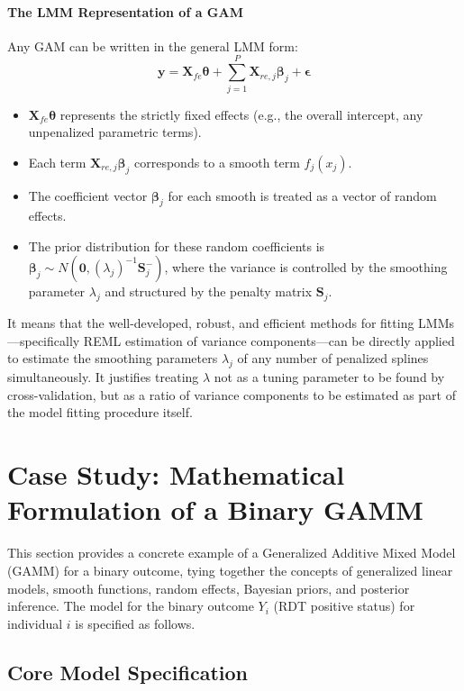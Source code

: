 \documentclass[11pt, a4paper]{article}
\begin{document}
\paragraph{The LMM Representation of a GAM}
Any GAM can be written in the general LMM form:
\[ \mathbf{y} = \mathbf{X}_{fe}\boldsymbol{\theta} + \sum_{j=1}^{P} \mathbf{X}_{re, j}\boldsymbol{\beta}_j + \boldsymbol{\epsilon} \]
\begin{itemize}
    \item $\mathbf{X}_{fe}\boldsymbol{\theta}$ represents the strictly fixed effects (e.g., the overall intercept, any unpenalized parametric terms).
    \item Each term $\mathbf{X}_{re, j}\boldsymbol{\beta}_j$ corresponds to a smooth term $f_j(x_j)$.
    \item The coefficient vector $\boldsymbol{\beta}_j$ for each smooth is treated as a vector of random effects.
    \item The prior distribution for these random coefficients is $\boldsymbol{\beta}_j \sim N(\mathbf{0}, (\lambda_j)^{-1}\mathbf{S}_j^{-})$, where the variance is controlled by the smoothing parameter $\lambda_j$ and structured by the penalty matrix $\mathbf{S}_j$.
\end{itemize}
 It means that the well-developed, robust, and efficient methods for fitting LMMs—specifically REML estimation of variance components—can be directly applied to estimate the smoothing parameters $\lambda_j$ of any number of penalized splines simultaneously. It justifies treating $\lambda$ not as a tuning parameter to be found by cross-validation, but as a ratio of variance components to be estimated as part of the model fitting procedure itself.

\newpage
\section{Case Study: Mathematical Formulation of a Binary GAMM}
This section provides a concrete example of a Generalized Additive Mixed Model (GAMM) for a binary outcome, tying together the concepts of generalized linear models, smooth functions, random effects, Bayesian priors, and posterior inference. The model for the binary outcome $Y_i$ (RDT positive status) for individual $i$ is specified as follows.

\subsection{Core Model Specification}
\end{document}
